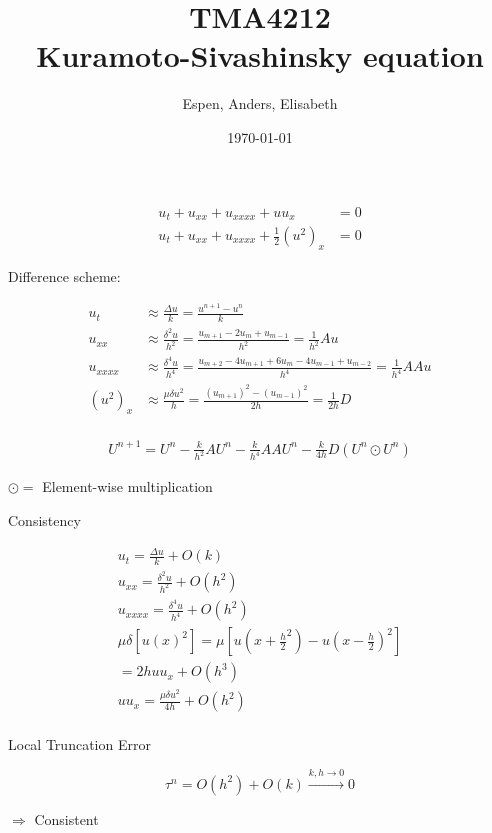 \documentclass[16pt]{article}
\title{TMA4212 \\ Kuramoto-Sivashinsky equation}
\author{Espen, Anders, Elisabeth}
\date{\today}
\begin{document}
\huge


\begin{align*}
u_t + u_{xx} + u_{xxxx} + uu_x &= 0 \\
u_t + u_{xx} + u_{xxxx} + \frac{1}{2}(u^2)_x &= 0
\end{align*}

Difference scheme:

\LARGE
\begin{align*}
u_t &\approx \frac{\Delta u}{k} = \frac{u^{n+1}-u^n}{k} \\
u_{xx} &\approx \frac{\delta^2 u}{h^2} = \frac{u_{m+1}-2u_{m}+u_{m-1}}{h^2} = \frac{1}{h^2}Au \\
u_{xxxx} &\approx \frac{\delta^4 u}{h^4} = \frac{u_{m+2}-4u_{m+1}+6u_m-4u_{m-1}+u_{m-2}}{h^4} = \frac{1}{h^4}AAu\\
(u^2)_{x} &\approx \frac{\mu \delta u^2}{h} = \frac{(u_{m+1})^2-(u_{m-1})^2}{2h} = \frac{1}{2h}D\\
\end{align*}

\begin{align*}
U^{n+1} = U^n - \frac{k}{h^2}AU^n - \frac{k}{h^4}AAU^n - \frac{k}{4h}D(U^{n}\odot U^n)
\end{align*}

$\odot =$ Element-wise multiplication

\newpage

Consistency

\begin{align*}
u_t= \frac{\Delta u}{k} + O(k) \\
u_{xx} = \frac{\delta^2 u}{h^2} + O(h^2) \\
u_{xxxx} = \frac{\delta^4 u}{h^4} + O(h^2) \\
\mu \delta [u(x)^2] = \mu[u(x+\frac{h}{2}^2) - u(x - \frac{h}{2})^2] \\
= 2huu_{x} + O(h^3) \\
uu_{x} = \frac{\mu \delta u^2}{4h} + O(h^2) \\
\end{align*}

Local Truncation Error

\begin{equation}
\tau ^n = O(h^2) + O(k) \xrightarrow{k,h \to 0} 0
\end{equation}

$\Rightarrow$ Consistent
\end{document}
